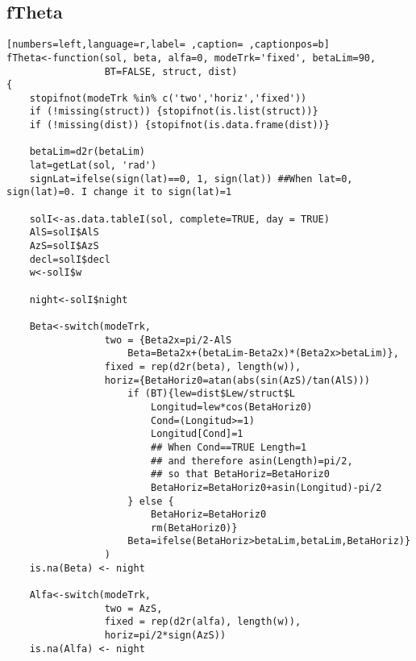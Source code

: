 \subsection{fTheta}
\label{sec:orgc0b1c4f}
\begin{lstlisting}[numbers=left,language=r,label= ,caption= ,captionpos=b]
fTheta<-function(sol, beta, alfa=0, modeTrk='fixed', betaLim=90, 
                 BT=FALSE, struct, dist)
{
    stopifnot(modeTrk %in% c('two','horiz','fixed'))
    if (!missing(struct)) {stopifnot(is.list(struct))}
    if (!missing(dist)) {stopifnot(is.data.frame(dist))}

    betaLim=d2r(betaLim)
    lat=getLat(sol, 'rad')
    signLat=ifelse(sign(lat)==0, 1, sign(lat)) ##When lat=0, sign(lat)=0. I change it to sign(lat)=1

    solI<-as.data.tableI(sol, complete=TRUE, day = TRUE)
    AlS=solI$AlS
    AzS=solI$AzS
    decl=solI$decl
    w<-solI$w

    night<-solI$night

    Beta<-switch(modeTrk,
                 two = {Beta2x=pi/2-AlS	
                     Beta=Beta2x+(betaLim-Beta2x)*(Beta2x>betaLim)},
                 fixed = rep(d2r(beta), length(w)), 
                 horiz={BetaHoriz0=atan(abs(sin(AzS)/tan(AlS)))
                     if (BT){lew=dist$Lew/struct$L
                         Longitud=lew*cos(BetaHoriz0)
                         Cond=(Longitud>=1)
                         Longitud[Cond]=1
                         ## When Cond==TRUE Length=1
                         ## and therefore asin(Length)=pi/2,
                         ## so that BetaHoriz=BetaHoriz0
                         BetaHoriz=BetaHoriz0+asin(Longitud)-pi/2                                     
                     } else {
                         BetaHoriz=BetaHoriz0
                         rm(BetaHoriz0)}
                     Beta=ifelse(BetaHoriz>betaLim,betaLim,BetaHoriz)}
                 )
    is.na(Beta) <- night

    Alfa<-switch(modeTrk,
                 two = AzS,
                 fixed = rep(d2r(alfa), length(w)),
                 horiz=pi/2*sign(AzS))
    is.na(Alfa) <- night


\end{lstlisting}
